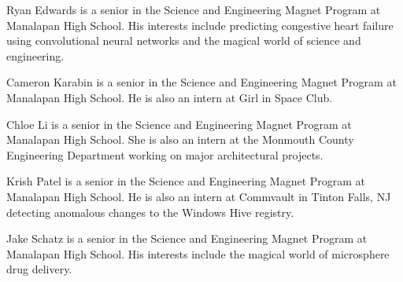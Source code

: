 \documentclass[10pt,journal,twoside]{IEEEtran}
\begin{document}




\begin{IEEEbiography}{Ryan Edwards} is a senior in the Science and Engineering Magnet Program at Manalapan High School. His interests include predicting congestive heart failure using convolutional neural networks and the magical world of science and engineering.
\end{IEEEbiography}
\begin{IEEEbiography}{Cameron Karabin} is a senior in the Science and Engineering Magnet Program at Manalapan High School. He is also an intern at Girl in Space Club.
\end{IEEEbiography}
\vfill
\newpage 
\begin{IEEEbiography}{Chloe Li} is a senior in the Science and Engineering Magnet Program at Manalapan High School. She is also an intern at the Monmouth County Engineering Department working on major architectural projects.
\end{IEEEbiography}
\begin{IEEEbiography}{Krish Patel} is a senior in the Science and Engineering Magnet Program at Manalapan High School. He is also an intern at Commvault in Tinton Falls, NJ detecting anomalous changes to the Windows Hive registry. 
\end{IEEEbiography}
\begin{IEEEbiography}{Jake Schatz} is a senior in the Science and Engineering Magnet Program at Manalapan High School. His interests include the magical world of microsphere drug delivery. 
\end{IEEEbiography}
\vfill
\end{document}
